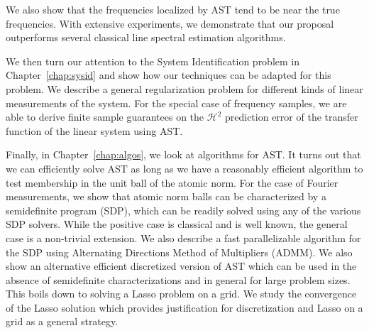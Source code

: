 We also show that the frequencies localized by AST tend to be near the true
frequencies. With extensive experiments, we demonstrate that our proposal
outperforms several classical line spectral estimation algorithms.

We then turn our attention to the System Identification problem in
Chapter~\ref{chap:sysid} and show how our techniques can be adapted for this
problem. We describe a general regularization problem for different kinds of
linear measurements of the system. For the special case of frequency samples, we
are able to derive finite sample guarantees on the $\mathcal{H}^2$ prediction
error of the transfer function of the linear system using AST.

Finally, in Chapter~\ref{chap:algos}, we look at algorithms for AST. It turns
out that we can efficiently solve AST as long as we have a reasonably efficient
algorithm to test membership in the unit ball of the atomic norm. For the case
of Fourier measurements, we show that atomic norm balls can be characterized by
a semidefinite program (SDP), which can be readily solved using any of the
various SDP solvers. While the positive case is classical and is well known, the
general case is a non-trivial extension. We also describe a fast parallelizable
algorithm for the SDP using Alternating Directions Method of Multipliers (ADMM).
We also show an alternative efficient discretized version of AST which can be
used in the absence of semidefinite characterizations and in general for large
problem sizes. This boils down to solving a Lasso problem on a grid. We study
the convergence of the Lasso solution which provides justification for
discretization and Lasso on a grid as a general strategy.

